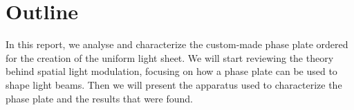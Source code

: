 \section{Outline}
In this report, we analyse and characterize the custom-made phase plate ordered for the creation of the uniform light sheet. We will start reviewing the theory behind spatial light modulation, focusing on how a phase plate can be used to shape light beams. Then we will present the apparatus used to characterize the phase plate and the results that were found.